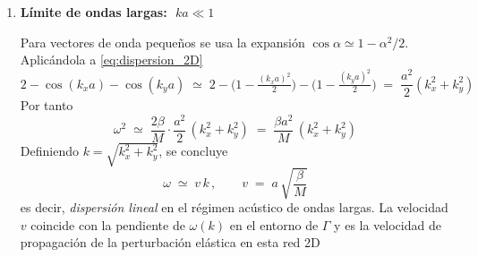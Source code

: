 \documentclass{article}
\newenvironment{AGbox}[1][7]%
{%
  \begin{tcolorbox}[
    enhanced, breakable,
    colframe=AppleGreen,
    colback=AppleGreen!#1,
    boxrule=1pt,
    borderline west={2mm}{-10mm}{AppleGreen},
    sharp corners=southwest,
    left=14pt,right=14pt,top=10pt,bottom=10pt,
     boxsep=6pt,
  ]%
}{%
  \end{tcolorbox}%
}
\begin{document}
\begin{AGbox}[8]
\begin{enumerate}[label={{\textcolor{trueblue}{\textbf{Pr.} \arabic*.3}}}, start=1]
\begin{enumerate}[label=\textbf{(\alph*)}]
  Buscamos un modo normal como onda plana en 2D
  \begin{equation}
    u_{l,s}(t)=u_0\,
    \exp\!\big[i(lk_x a + s k_y a - \omega t)\big]
    \label{eq:onda_plana_2D}
  \end{equation}
  De \eqref{eq:onda_plana_2D} se sigue que
  \[
    u_{l\pm1,s}=u_{l,s}\,e^{\pm i k_x a}
    \qquad\text{y}\qquad
    u_{l,s\pm1}=u_{l,s}\,e^{\pm i k_y a}
  \]
  Sustituyendo en \eqref{eq:mov_red_cuadrada} y dividiendo por el factor común $u_{l,s}$ se obtiene
  \[
    -\,m\omega^2
    \;=\;
    \beta\big[\,(e^{ik_xa}+e^{-ik_xa}-2)+(e^{ik_ya}+e^{-ik_ya}-2)\,\big]
  \]
  Usando $e^{ix}+e^{-ix}=2\cos x$, resulta
  \begin{equation}
    \boxed{\,\omega^{2}(k_x,k_y)
    \;=\;
    \frac{2\beta}{M}\,\Big[\,2-\cos(k_x a)-\cos(k_y a)\,\Big]\,}
    \label{eq:dispersion_2D}
  \end{equation}
  con $M=m$ la masa de cada átomo. Esta es la análoga 2D del resultado 1D monoatómico $\,\omega^2=\tfrac{2\beta}{m}\,[1-\cos(ka)]\,$ que ya conoces de la cadena lineal

  \item \textbf{Límite de ondas largas: $\;ka\ll 1$}

  Para vectores de onda pequeños se usa la expansión $\cos\alpha\simeq 1-\alpha^2/2$. Aplicándola a \eqref{eq:dispersion_2D}
  \[
    2-\cos(k_x a)-\cos(k_y a)
    \;\simeq\;
    2-\Big(1-\tfrac{(k_x a)^2}{2}\Big)-\Big(1-\tfrac{(k_y a)^2}{2}\Big)
    \;=\;\frac{a^2}{2}(k_x^2+k_y^2)
  \]
  Por tanto
  \begin{equation}
    \omega^2 \;\simeq\; \frac{2\beta}{M}\cdot\frac{a^2}{2}\,(k_x^2+k_y^2)
    \;=\; \frac{\beta a^2}{M}\,(k_x^2+k_y^2)
    \label{eq:dispersion_2D_peqk}
  \end{equation}
  Definiendo $k=\sqrt{k_x^2+k_y^2}$, se concluye
  \begin{equation}
    \boxed{\,\omega \;\simeq\; v\,k\,,\qquad v \;=\; a\,\sqrt{\frac{\beta}{M}}\,}
    \label{eq:lineal_baja_k}
  \end{equation}
  es decir, \emph{dispersión lineal} en el régimen acústico de ondas largas. La velocidad $v$ coincide con la pendiente de $\omega(k)$ en el entorno de $\Gamma$ y es la velocidad de propagación de la perturbación elástica en esta red 2D
  \end{enumerate}
\end{enumerate}
\end{AGbox}
\end{document}
